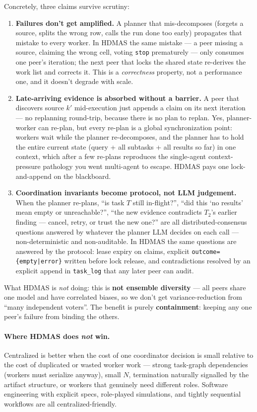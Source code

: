 \documentclass[11pt]{article}
\newcommand{\code}[1]{\texttt{#1}}
\begin{document}
Concretely, three claims survive scrutiny:

\begin{enumerate}[leftmargin=1.5em]
  \item \textbf{Failures don't get amplified.} A planner that mis-decomposes (forgets a source, splits the wrong row, calls the run done too early) propagates that mistake to every worker. In HDMAS the same mistake --- a peer missing a source, claiming the wrong cell, voting \code{stop} prematurely --- only consumes one peer's iteration; the next peer that locks the shared state re-derives the work list and corrects it. This is a \emph{correctness} property, not a performance one, and it doesn't degrade with scale.
  \item \textbf{Late-arriving evidence is absorbed without a barrier.} A peer that discovers source $k'$ mid-execution just appends a claim on its next iteration --- no replanning round-trip, because there is no plan to replan. Yes, planner-worker can re-plan, but every re-plan is a global synchronization point: workers wait while the planner re-decomposes, and the planner has to hold the entire current state (query + all subtasks + all results so far) in one context, which after a few re-plans reproduces the single-agent context-pressure pathology you went multi-agent to escape. HDMAS pays one lock-and-append on the blackboard.
  \item \textbf{Coordination invariants become protocol, not LLM judgement.} When the planner re-plans, ``is task $T$ still in-flight?'', ``did this `no results' mean empty or unreachable?'', ``the new evidence contradicts $T_2$'s earlier finding --- cancel, retry, or trust the new one?'' are all distributed-consensus questions answered by whatever the planner LLM decides on each call --- non-deterministic and non-auditable. In HDMAS the same questions are answered by the protocol: lease expiry on claims, explicit \code{outcome=\{empty|error\}} written before lock release, and contradictions resolved by an explicit append in \code{task\_log} that any later peer can audit.
\end{enumerate}

What HDMAS is \emph{not} doing: this is \textbf{not ensemble diversity} --- all peers share one model and have correlated biases, so we don't get variance-reduction from ``many independent voters''. The benefit is purely \textbf{containment}: keeping any one peer's failure from binding the others.

\paragraph{Where HDMAS does \emph{not} win.} Centralized is better when the cost of one coordinator decision is small relative to the cost of duplicated or wasted worker work --- strong task-graph dependencies (workers must serialize anyway), small $N$, termination naturally signalled by the artifact structure, or workers that genuinely need different roles. Software engineering with explicit specs, role-played simulations, and tightly sequential workflows are all centralized-friendly.
\end{document}
